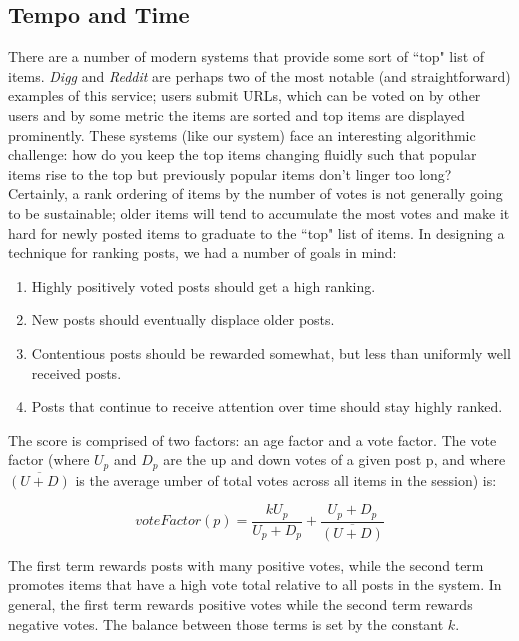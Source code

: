 \subsection{Tempo and Time}

There are a number of modern systems that provide some sort of ``top" list of items. \emph{Digg} and \emph{Reddit} are perhaps two of the most notable (and straightforward) examples of this service; users submit URLs, which can be voted on by other users and by some metric the items are sorted and top items are displayed prominently. These systems (like our system) face an interesting algorithmic challenge: how do you keep the top items changing fluidly such that popular items rise to the top but previously popular items don't linger too long? Certainly, a rank ordering of items by the number of votes is not generally going to be sustainable; older items will tend to accumulate the most votes and make it hard for newly posted items to graduate to the ``top" list of items. In designing a technique for ranking posts, we had a number of goals in mind:

\begin{enumerate}
\item{Highly positively voted posts should get a high ranking.}
\item{New posts should eventually displace older posts.}
\item{Contentious posts should be rewarded somewhat, but less than uniformly well received posts.}
\item{Posts that continue to receive attention over time should stay highly ranked.}
\end{enumerate}

The score is comprised of two factors: an age factor and a vote factor. The vote factor (where $U_p$ and $D_p$ are the up and down votes of a given post p, and where $\overline{(U+D)}$ is the average umber of total votes across all items in the session) is:

\begin{equation}
voteFactor(p) = \frac{kU_p}{U_p + D_p} + \frac{U_p + D_p}{\overline{(U+D)}}
\end{equation}

The first term rewards posts with many positive votes, while the second term promotes items that have a high vote total relative to all posts in the system. In general, the first term rewards positive votes while the second term rewards negative votes. The balance between those terms is set by the constant $k$. 

